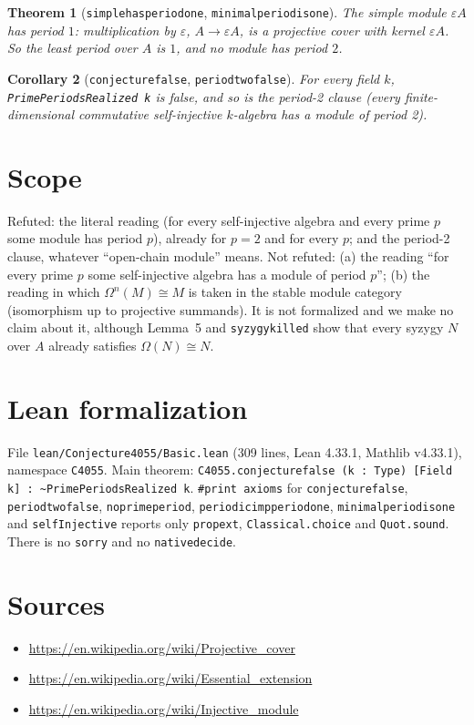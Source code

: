 \documentclass[11pt]{article}
\renewcommand{\_}{\oldus\allowbreak}
\newtheorem{theorem}{Theorem}
\newtheorem{corollary}[theorem]{Corollary}
\theoremstyle{definition}
\theoremstyle{remark}
\begin{document}
\begin{theorem}[\texttt{simple\_has\_period\_one}, \texttt{minimal\_period\_is\_one}]
The simple module $\varepsilon A$ has period $1$: multiplication by $\varepsilon$, $A\to\varepsilon A$, is a
projective cover with kernel $\varepsilon A$. So the least period over $A$ is $1$, and no module has
period $2$.
\end{theorem}

\begin{corollary}[\texttt{conjecture\_4055\_false}, \texttt{period\_two\_false}]
For every field $k$, \texttt{PrimePeriodsRealized k} is false, and so is the period-2 clause
(every finite-dimensional commutative self-injective $k$-algebra has a module of period 2).
\end{corollary}

\section{Scope}

Refuted: the literal reading (for every self-injective algebra and every prime $p$ some module has
period $p$), already for $p=2$ and for every $p$; and the period-2 clause, whatever ``open-chain
module'' means. Not refuted: (a) the reading ``for every prime $p$ some self-injective algebra has a
module of period $p$''; (b) the reading in which $\Omega^n(M)\cong M$ is taken in the stable module
category (isomorphism up to projective summands). It is not formalized and we make no claim about
it, although Lemma~5 and \texttt{syzygy\_killed} show that every syzygy $N$ over $A$ already satisfies
$\Omega(N)\cong N$.

\section{Lean formalization}

File \texttt{lean/Conjecture4055/Basic.lean} (309 lines, Lean 4.33.1, Mathlib v4.33.1),
namespace \texttt{C4055}. Main theorem:
\texttt{C4055.conjecture\_4055\_false (k : Type) [Field k] : \textasciitilde PrimePeriodsRealized k}.
\texttt{\#print axioms} for \texttt{conjecture\_4055\_false}, \texttt{period\_two\_false},
\texttt{no\_prime\_period}, \texttt{periodic\_imp\_period\_one}, \texttt{minimal\_period\_is\_one}
and \texttt{selfInjective} reports only \texttt{propext}, \texttt{Classical.choice} and
\texttt{Quot.sound}. There is no \texttt{sorry} and no \texttt{native\_decide}.

\section*{Sources}
\begin{itemize}
\item \url{https://en.wikipedia.org/wiki/Projective_cover}
\item \url{https://en.wikipedia.org/wiki/Essential_extension}
\item \url{https://en.wikipedia.org/wiki/Injective_module}
\end{itemize}
\end{document}
